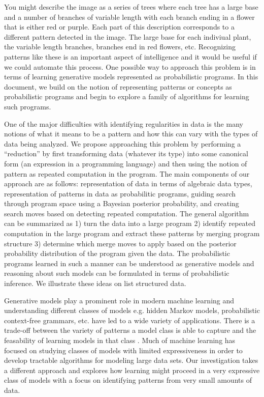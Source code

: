 \documentclass[a4paper,10pt]{article}
\begin{document}
You might describe the image as a series of trees where each tree has a large base and a number of branches of variable length with each branch ending in a flower that is either red or purple.  Each part of this description corresponds to a different pattern detected in the image.  The large base for each indiviual plant, the variable length branches, branches end in red flowers, etc.  Recognizing patterns like these is an important aspect of intelligence and it would be useful if we could automate this process.  One possible way to approach this problem is in terms of learning generative models represented as probabilistic programs.  In this document, we build on the notion of representing patterns or concepts as probabilistic programs \cite{A.Stuhlmueller:2010:6d11a} and begin to explore a family of algorithms for learning such programs.

One of the major difficulties with identifying regularities in data is the many notions of what it means to be a pattern and how this can vary with the types of data being analyzed.   We propose approaching this problem by performing a ``reduction'' by first transforming data (whatever its type) into some canonical form (an expression in a programming language) and then using the notion of pattern as repeated computation in the program.  The main components of our approach are as follows: representation of data in terms of algebraic data types, representation of patterns in data as probabilitic programs, guiding search through program space using a Bayesian posterior probability, and creating search moves based on detecting repeated computation.  The general algorithm can be summarized as 1) turn the data into a large program 2) identify repeated computation in the large program and extract these patterns by merging program structure 3) determine which merge moves to apply based on the posterior probability distribution of the program given the data.  The probabilistic programs learned in such a manner can be understood as generative models and reasoning about such models can be formulated in terms of probabilistic inference.  We illustrate these ideas on list structured data.  

Generative models play a prominent role in modern machine learning and understanding different classes of models e.g. hidden Markov models, probabilistic context-free grammars, etc. have led to a wide variety of applications.  There is a trade-off between the variety of patterns a model class is able to capture and the feasability of learning models in that class \cite{Russell2003}.  Much of machine learning has focused on studying classes of models with limited expressiveness in order to develop tractable algorithms for modeling large data sets.  Our investigation takes a different approach and explores how learning might proceed in a very expressive class of models with a focus on identifying patterns from very small amounts of data.  
\end{document}
